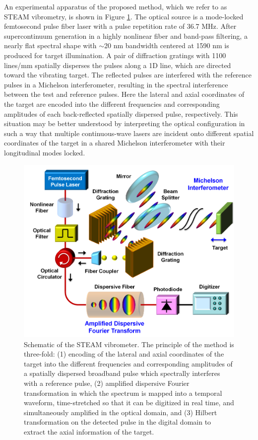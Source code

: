 An experimental apparatus of the proposed method, which we refer to as STEAM vibrometry, is shown in Figure \ref{fig:APL2011_Figure1}. The optical source is a mode-locked femtosecond pulse fiber laser with a pulse repetition rate of 36.7 MHz. After supercontinuum generation in a highly nonlinear fiber and band-pass filtering, a nearly flat spectral shape with $\sim$20 nm bandwidth centered at 1590 nm is produced for target illumination. A pair of diffraction gratings with 1100 lines/mm spatially disperses the pulses along a 1D line, which are directed toward the vibrating target. The reflected pulses are interfered with the reference pulses in a Michelson interferometer, resulting in the spectral interference between the test and reference pulses. Here the lateral and axial coordinates of the target are encoded into the different frequencies and corresponding amplitudes of each back-reflected spatially dispersed pulse, respectively. This situation may be better understood by interpreting the optical configuration in such a way that multiple continuous-wave lasers are incident onto different spatial coordinates of the target in a shared Michelson interferometer with their longitudinal modes locked.

\begin{figure}[htb!]
\centering
\includegraphics[scale=1]{APL2011/Figure1.png}
\caption{Schematic of the STEAM vibrometer. The principle of the method is three-fold: (1) encoding of the lateral and axial coordinates of the target into the different frequencies and corresponding amplitudes of a spatially dispersed broadband pulse which spectrally interferes with a reference pulse, (2) amplified dispersive Fourier transformation in which the spectrum is mapped into a temporal waveform, time-stretched so that it can be digitized in real time, and simultaneously amplified in the optical domain, and (3) Hilbert transformation on the detected pulse in the digital domain to extract the axial information of the target.}
\label{fig:APL2011_Figure1}
\end{figure}

